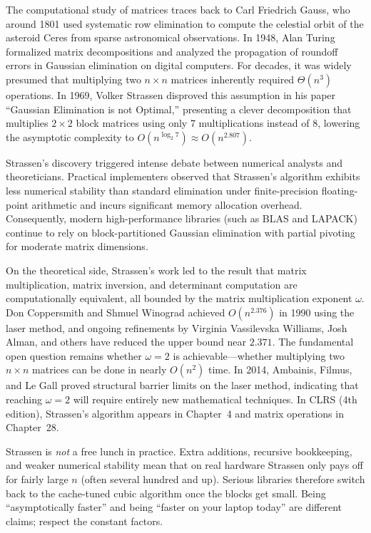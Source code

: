 \begin{historybox}
The computational study of matrices traces back to Carl Friedrich Gauss, who around 1801 used systematic row elimination to compute the celestial orbit of the asteroid Ceres from sparse astronomical observations. In 1948, Alan Turing formalized matrix decompositions and analyzed the propagation of roundoff errors in Gaussian elimination on digital computers. For decades, it was widely presumed that multiplying two $n \times n$ matrices inherently required $\Theta(n^3)$ operations. In 1969, Volker Strassen disproved this assumption in his paper ``Gaussian Elimination is not Optimal,'' presenting a clever decomposition that multiplies $2 \times 2$ block matrices using only 7 multiplications instead of 8, lowering the asymptotic complexity to $O(n^{\log_2 7}) \approx O(n^{2.807})$.

Strassen's discovery triggered intense debate between numerical analysts and theoreticians. Practical implementers observed that Strassen's algorithm exhibits less numerical stability than standard elimination under finite-precision floating-point arithmetic and incurs significant memory allocation overhead. Consequently, modern high-performance libraries (such as BLAS and LAPACK) continue to rely on block-partitioned Gaussian elimination with partial pivoting for moderate matrix dimensions.

On the theoretical side, Strassen's work led to the result that matrix multiplication, matrix inversion, and determinant computation are computationally equivalent, all bounded by the matrix multiplication exponent $\omega$. Don Coppersmith and Shmuel Winograd achieved $O(n^{2.376})$ in 1990 using the laser method, and ongoing refinements by Virginia Vassilevska Williams, Josh Alman, and others have reduced the upper bound near $2.371$. The fundamental open question remains whether $\omega = 2$ is achievable---whether multiplying two $n \times n$ matrices can be done in nearly $O(n^2)$ time. In 2014, Ambainis, Filmus, and Le Gall proved structural barrier limits on the laser method, indicating that reaching $\omega = 2$ will require entirely new mathematical techniques. In CLRS (4th edition), Strassen's algorithm appears in Chapter~4 and matrix operations in Chapter~28.
\end{historybox}

\begin{trapbox}
Strassen is \emph{not} a free lunch in practice. Extra additions, recursive
bookkeeping, and weaker numerical stability mean that on real hardware Strassen
only pays off for fairly large $n$ (often several hundred and up). Serious
libraries therefore switch back to the cache-tuned cubic algorithm once the
blocks get small. Being ``asymptotically faster'' and being ``faster on your
laptop today'' are different claims; respect the constant factors.
\end{trapbox}

